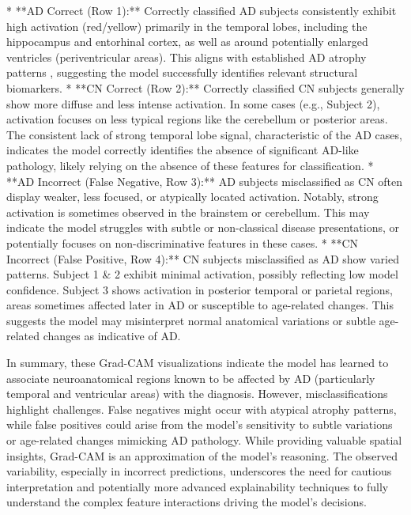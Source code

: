 \documentclass[11pt, a4paper]{article}
\begin{document}
*   **AD Correct (Row 1):** Correctly classified AD subjects consistently exhibit high activation (red/yellow) primarily in the temporal lobes, including the hippocampus and entorhinal cortex, as well as around potentially enlarged ventricles (periventricular areas). This aligns with established AD atrophy patterns \cite{vemuri2010role}, suggesting the model successfully identifies relevant structural biomarkers.
*   **CN Correct (Row 2):** Correctly classified CN subjects generally show more diffuse and less intense activation. In some cases (e.g., Subject 2), activation focuses on less typical regions like the cerebellum or posterior areas. The consistent lack of strong temporal lobe signal, characteristic of the AD cases, indicates the model correctly identifies the absence of significant AD-like pathology, likely relying on the absence of these features for classification.
*   **AD Incorrect (False Negative, Row 3):** AD subjects misclassified as CN often display weaker, less focused, or atypically located activation. Notably, strong activation is sometimes observed in the brainstem or cerebellum. This may indicate the model struggles with subtle or non-classical disease presentations, or potentially focuses on non-discriminative features in these cases.
*   **CN Incorrect (False Positive, Row 4):** CN subjects misclassified as AD show varied patterns. Subject 1 \& 2 exhibit minimal activation, possibly reflecting low model confidence. Subject 3 shows activation in posterior temporal or parietal regions, areas sometimes affected later in AD or susceptible to age-related changes. This suggests the model may misinterpret normal anatomical variations or subtle age-related changes as indicative of AD.

In summary, these Grad-CAM visualizations indicate the model has learned to associate neuroanatomical regions known to be affected by AD (particularly temporal and ventricular areas) with the diagnosis. However, misclassifications highlight challenges. False negatives might occur with atypical atrophy patterns, while false positives could arise from the model's sensitivity to subtle variations or age-related changes mimicking AD pathology. While providing valuable spatial insights, Grad-CAM is an approximation of the model's reasoning. The observed variability, especially in incorrect predictions, underscores the need for cautious interpretation and potentially more advanced explainability techniques to fully understand the complex feature interactions driving the model's decisions.
\end{document}
